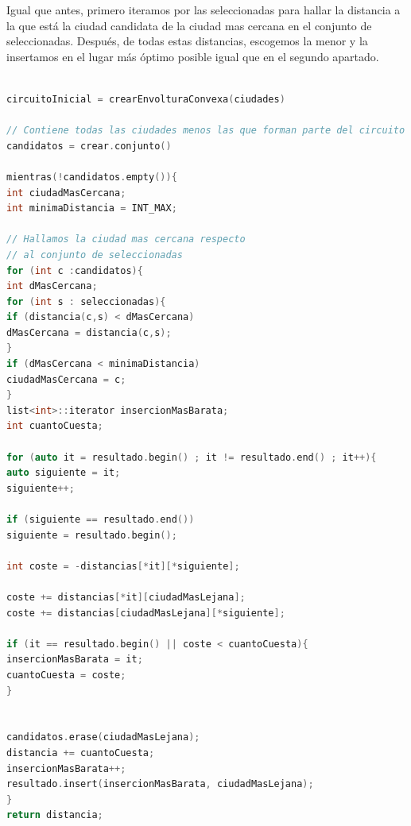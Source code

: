 \documentclass{article}
\begin{document}
Igual que antes, primero iteramos por las seleccionadas para hallar la distancia a la que está la ciudad candidata de la ciudad mas cercana en el conjunto de seleccionadas.
Después, de todas estas distancias, escogemos la menor y la insertamos en el lugar más óptimo posible igual que en el segundo apartado.
\begin{lstlisting}[language=c, caption =Pseudocódigo de inserción con envoltura convexa y ciudad más lejana]

circuitoInicial = crearEnvolturaConvexa(ciudades)

// Contiene todas las ciudades menos las que forman parte del circuito inicial
candidatos = crear.conjunto()

mientras(!candidatos.empty()){
int ciudadMasCercana;
int minimaDistancia = INT_MAX;

// Hallamos la ciudad mas cercana respecto
// al conjunto de seleccionadas
for (int c :candidatos){
int dMasCercana;
for (int s : seleccionadas){
if (distancia(c,s) < dMasCercana)
dMasCercana = distancia(c,s);
}
if (dMasCercana < minimaDistancia)
ciudadMasCercana = c;
}
list<int>::iterator insercionMasBarata;
int cuantoCuesta;

for (auto it = resultado.begin() ; it != resultado.end() ; it++){
auto siguiente = it;
siguiente++;

if (siguiente == resultado.end())
siguiente = resultado.begin();

int coste = -distancias[*it][*siguiente];

coste += distancias[*it][ciudadMasLejana];
coste += distancias[ciudadMasLejana][*siguiente];

if (it == resultado.begin() || coste < cuantoCuesta){
insercionMasBarata = it;
cuantoCuesta = coste;
}


candidatos.erase(ciudadMasLejana);
distancia += cuantoCuesta;
insercionMasBarata++;
resultado.insert(insercionMasBarata, ciudadMasLejana);	
}
return distancia;

\end{lstlisting}
\end{document}
